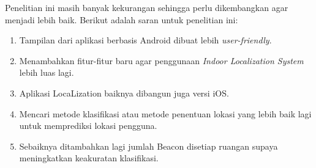 Penelitian ini masih banyak kekurangan sehingga perlu dikembangkan agar menjadi lebih baik. Berikut adalah saran untuk penelitian ini:
\begin{enumerate}
	\item Tampilan dari aplikasi berbasis Android dibuat lebih \textit{user-friendly}.
	\item Menambahkan fitur-fitur baru agar penggunaan \textit{Indoor Localization System} lebih luas lagi.
	\item Aplikasi LocaLization baiknya dibangun juga  versi iOS.
	\item Mencari metode klasifikasi atau metode penentuan lokasi yang lebih baik lagi untuk memprediksi lokasi pengguna.
	\item Sebaiknya ditambahkan lagi jumlah Beacon disetiap ruangan supaya meningkatkan keakuratan klasifikasi.

\end{enumerate}

\fancyhf{}
\fancyfoot[R]{\thepage}

\begin{comment}

\end{comment}
